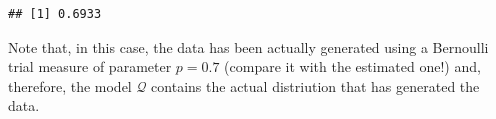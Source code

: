 \begin{example}
\begin{knitrout}
\color{fgcolor}\begin{kframe}
\begin{alltt}
\end{alltt}
\begin{verbatim}
## [1] 0.6933
\end{verbatim}
\begin{alltt}
\end{alltt}
\end{kframe}
\end{knitrout}
Note that, in this case, the data has been actually generated using a Bernoulli trial measure of parameter $p = 0.7$ (compare it with the estimated one!) and, therefore, the model $\mathcal Q$ contains the actual distriution that has generated the data. 
	\end{example}

